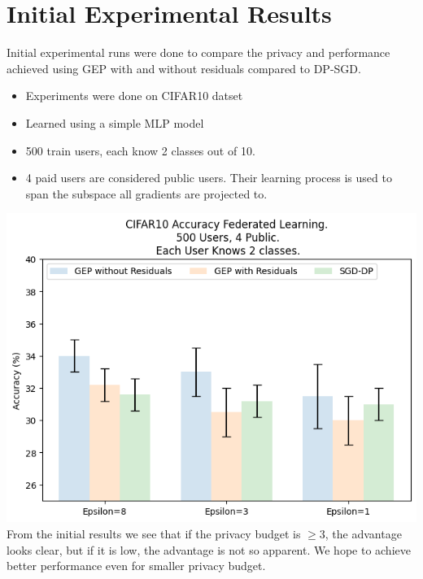 \documentclass[fourier]{_style/dissertation}
\begin{document}
\section{Initial Experimental Results}
Initial experimental runs  were done to compare the privacy and performance achieved using GEP with and without residuals compared to DP-SGD.

 \begin{itemize}
           \item Experiments were done on CIFAR10 datset
           \item Learned using a simple MLP model
           \item 500 train users, each know 2 classes out of 10.
           \item 4 paid users are considered public users. Their learning process is used to span the subspace all gradients are projected to.
 \end{itemize}
  \includegraphics[height = 0.55\textwidth]{images/cifar10_dpsgd_vs_gep.png} \\
  From the initial results we see that if the privacy budget is $ \geq 3$, the advantage looks clear, but if it is low, the advantage is not so apparent. We hope to achieve better performance even for smaller privacy budget.

\printbibliography
\end{document}
